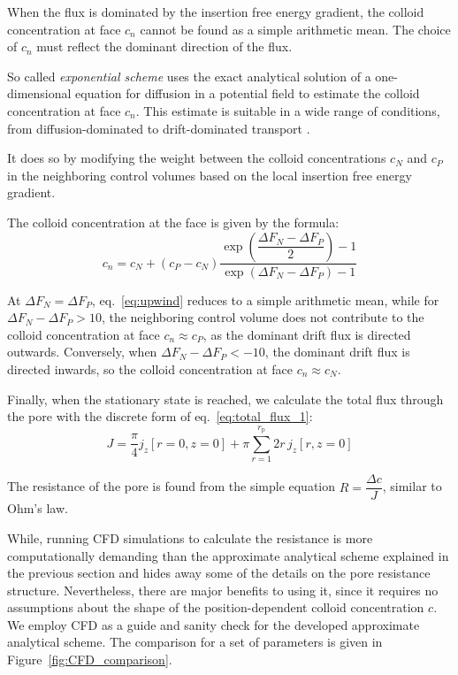 \documentclass[10pt, a4paper]{article}
\begin{document}
\begin{multicols}{2}
When the flux is dominated by the insertion free energy gradient, the colloid concentration at face $c_n$ cannot be found as a simple arithmetic mean.
The choice of $c_n$ must reflect the dominant direction of the flux.

So called \emph{exponential scheme} uses the exact analytical solution of a one-dimensional equation for diffusion in a potential field to estimate the colloid concentration at face $c_n$.
This estimate is suitable in a wide range of conditions, from diffusion-dominated to drift-dominated transport \cite{Patankar1980,Versteeg2007}.

It does so by modifying the weight between the colloid concentrations $c_N$ and $c_P$ in the neighboring control volumes based on the local insertion free energy gradient.

The colloid concentration at the face is given by the formula:
\begin{equation}
    \label{eq:upwind}
    c_n = c_N + (c_P - c_N) \frac{\exp\left( \dfrac{\Delta F_N - \Delta F_P}{2} \right) - 1}{\exp\left( \Delta F_N - \Delta F_P \right) - 1}
\end{equation}

At $\Delta F_N = \Delta F_P$, eq.~\ref{eq:upwind} reduces to a simple arithmetic mean, while for $\Delta F_N - \Delta F_P > 10$, the neighboring control volume does not contribute to the colloid concentration at face $c_n \approx c_P$, as the dominant drift flux is directed outwards.
Conversely, when $\Delta F_N - \Delta F_P < -10$, the dominant drift flux is directed inwards, so the colloid concentration at face $c_n \approx c_N$.




Finally, when the stationary state is reached, we calculate the total flux through the pore with the discrete form of eq.~\ref{eq:total_flux_1}:
\begin{equation}
    \label{eq:total_flux_2}
    J = \frac{\pi}{4} j_z[ r = 0, z = 0 ] + \pi \sum_{r = 1}^{r_{\text{p}}} 2 r \, j_z[ r, z = 0 ]
\end{equation}

The resistance of the pore is found from the simple equation $R = \dfrac{\Delta c}{J}$, similar to Ohm's law.

While, running CFD simulations to calculate the resistance is more computationally demanding than the approximate analytical scheme explained in the previous section and hides away some of the details on the pore resistance structure.
Nevertheless, there are major benefits to using it, since it requires no assumptions about the shape of the position-dependent colloid concentration $c$.
We employ CFD as a guide and sanity check for the developed approximate analytical scheme.
The comparison for a set of parameters is given in Figure~\ref{fig:CFD_comparison}.


\end{multicols}
\end{document}
